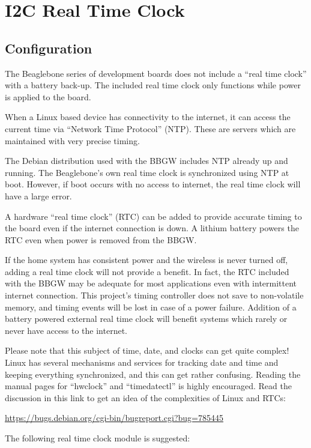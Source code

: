 \chapter{I2C Real Time Clock}

\section{Configuration}
The Beaglebone series of development boards does not include a ``real time clock'' with a battery back-up.  The included real time clock only functions while power is applied to the board.

When a Linux based device has connectivity to the internet, it can access the current time via ``Network Time Protocol'' (NTP).  These are servers which are maintained with very precise timing.

The Debian distribution used with the BBGW includes NTP already up and running.  The Beaglebone's own real time clock is synchronized using NTP at boot.  However, if boot occurs with no access to internet, the real time clock will have a large error.

A hardware ``real time clock'' (RTC) can be added to provide accurate timing to the board even if the internet connection is down.  A lithium battery powers the RTC even when power is removed from the BBGW.

If the home system has consistent power and the wireless is never turned off, adding a real time clock will not provide a benefit.  In fact, the RTC included with the BBGW may be adequate for most applications even with intermittent internet connection.  This project's timing controller does not save to non-volatile memory, and timing events will be lost in case of a power failure.  Addition of a battery powered external real time clock will benefit systems which rarely or never have access to the internet.

Please note that this subject of time, date, and clocks can get quite complex!  Linux has several mechanisms and services for tracking date and time and keeping everything synchronized, and this can get rather confusing.  Reading the manual pages for ``hwclock'' and ``timedatectl'' is highly encouraged.  Read the discussion in this link to get an idea of the complexities of Linux and RTCs:

\url{https://bugs.debian.org/cgi-bin/bugreport.cgi?bug=785445}

The following real time clock module is suggested:

